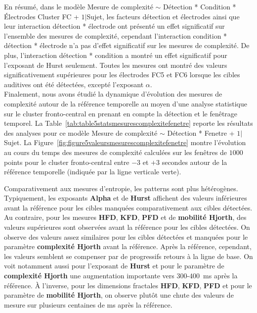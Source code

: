 En résumé, dans le modèle Mesure de complexité $\sim$ Détection * Condition * Électrodes Cluster FC + $1|$Sujet, les facteurs détection et électrodes ainsi que leur interaction détection * électrode ont présenté un effet significatif sur l'ensemble des mesures de complexité, cependant l'interaction condition * détection * électrode n'a pas d'effet significatif sur les mesures de complexité. 
De plus, l'interaction détection * condition a montré un effet significatif pour l'exposant de Hurst seulement.  
Toutes les mesures ont montré des valeurs significativement supérieures pour les électrodes FC5 et FC6 lorsque les cibles auditives ont été détectées, excepté l'exposant $\alpha$. \\

Finalement, nous avons étudié la dynamique d'évolution des mesures de complexité autour de la référence temporelle au moyen d'une analyse statistique sur le cluster fronto-central en prenant en compte la détection et le fenêtrage temporel. 
La Table~\ref{tab:table5statsmesurescomplexitefenetre} reporte les résultats des analyses pour ce modèle Mesure de complexité $\sim$ Détection * Fenetre + $1|$Sujet. 
La Figure~\ref{fig:figure5valeursmesurescomplexitefenetre} montre l'évolution au cours du temps des mesures de complexité calculées sur les fenêtres de $1000$ points pour le cluster fronto-central entre $-3$ et $+3$ secondes autour de la référence temporelle (indiquée par la ligne verticale verte). 

Comparativement aux mesures d'entropie, les patterns sont plus hétérogènes.
Typiquement, les exposants \textbf{Alpha} et de \textbf{Hurst} affichent des valeurs inférieures avant la référence pour les cibles manquées comparativement aux cibles détectées. 
Au contraire, pour les mesures \textbf{HFD}, \textbf{KFD}, \textbf{PFD} et de \textbf{mobilité Hjorth}, des valeurs supérieures sont observées avant la référence pour les cibles détectées. 
On observe des valeurs assez similaires pour les cibles détectées et manquées pour le paramètre \textbf{complexité Hjorth} avant la référence. 
Après la référence, cependant, les valeurs semblent se compenser par de progressifs retours à la ligne de base. 
On voit notamment aussi pour l'exposant de \textbf{Hurst} et pour le paramètre de \textbf{complexité Hjorth} une augmentation importante vers $300$-$400$~ms après la référence.
À l'inverse, pour les dimensions fractales \textbf{HFD}, \textbf{KFD}, \textbf{PFD} et pour le paramètre de \textbf{mobilité Hjorth}, on observe plutôt une chute des valeurs de mesure sur plusieurs centaines de ms après la référence. \\

